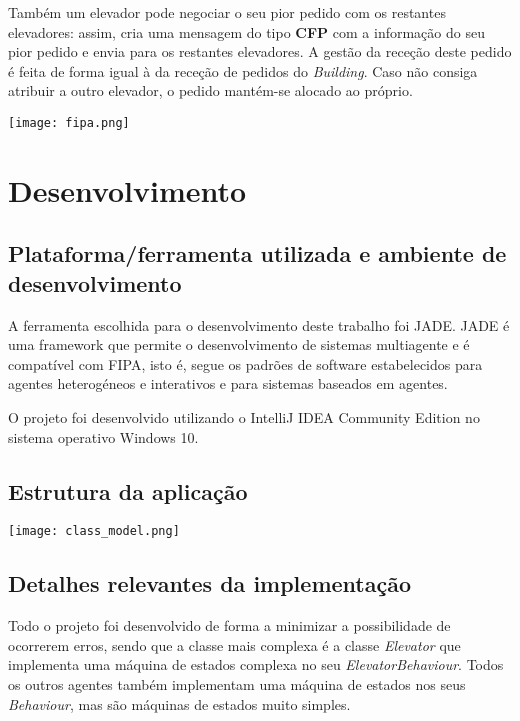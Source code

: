 \documentclass[a4paper]{article}
\begin{document}
Também um elevador pode negociar o seu pior pedido com os restantes elevadores: assim, cria uma mensagem do tipo \textbf{CFP} com a informação do seu pior pedido e envia para os restantes elevadores. A gestão da receção deste pedido é feita de forma igual à da receção de pedidos do \textit{Building}. Caso não consiga atribuir a outro elevador, o pedido mantém-se alocado ao próprio. 

\begin{center}
	\texttt{[image: fipa.png]}
\end{center}

\newpage

\section{Desenvolvimento}

\subsection{Plataforma/ferramenta utilizada e ambiente de desenvolvimento} 

A ferramenta escolhida para o desenvolvimento deste trabalho foi JADE. JADE é uma framework que permite o desenvolvimento de sistemas multiagente e é compatível com FIPA, isto é, segue os padrões de software estabelecidos para agentes heterogéneos e interativos e para sistemas baseados em agentes.

O projeto foi desenvolvido utilizando o IntelliJ IDEA Community Edition no sistema operativo Windows 10.

\subsection{Estrutura da aplicação} 

\begin{center}
\hspace*{-3.2cm}
	\texttt{[image: class\_model.png]}\linebreak\linebreak
\end{center}

\subsection{Detalhes relevantes da implementação} 

Todo o projeto foi desenvolvido de forma a minimizar a possibilidade de ocorrerem erros, sendo que a classe mais complexa é a classe \textit{Elevator} que implementa uma máquina de estados complexa no seu \textit{ElevatorBehaviour}. Todos os outros agentes também implementam uma máquina de estados nos seus \textit{Behaviour}, mas são máquinas de estados muito simples.
\end{document}
